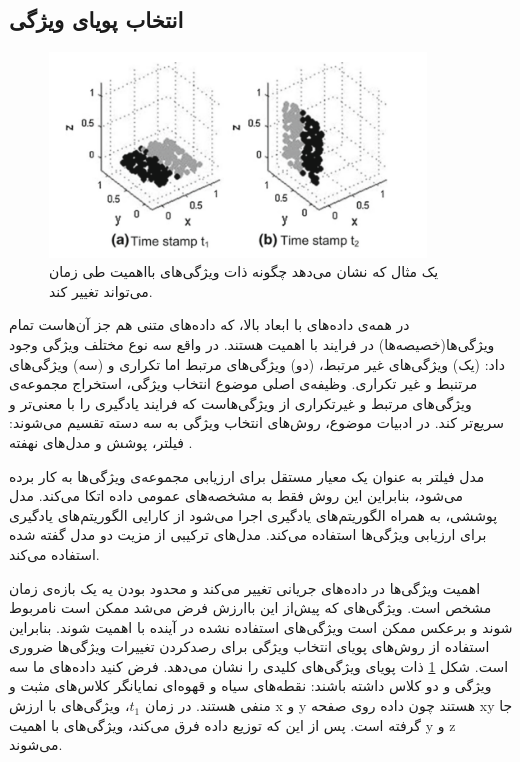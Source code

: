 \subsection{انتخاب پویای ویژگی}

\begin{figure}%
\centerline{\includegraphics[width=10cm]{dynamic_feature}}
\caption{یک مثال که نشان می‌دهد چگونه ذات ویژگی‌های بااهمیت طی زمان می‌تواند تغییر کند.}
\label{fig:dynamic_feature}
\end{figure}

در همه‌ی داده‌های با ابعاد بالا، که داده‌های متنی هم جز آن‌هاست تمام ویژگی‌ها(خصیصه‌ها) در فرایند با اهمیت هستند. در واقع سه نوع مختلف ویژگی وجود داد: (یک) ویژگی‌های غیر مرتبط، (دو) ویژگی‌های مرتبط اما تکراری و (سه) ویژگی‌های مرتنبط و غیر تکراری. وظیفه‌ی اصلی موضوع انتخاب ویژگی، استخراج مجموعه‌ی ویژگی‌های مرتبط و غیرتکراری از ویژگی‌هاست که فرایند یادگیری را با معنی‌تر و سریع‌تر کند. در ادبیات موضوع، روش‌های انتخاب ویژگی به سه دسته تقسیم می‌شوند: فیلتر، پوشش
و مدل‌های نهفته
.

مدل فیلتر به عنوان یک معیار مستقل برای ارزیابی مجموعه‌ی ویژگی‌ها به‌ کار برده می‌شود، بنابراین این روش فقط به مشخصه‌های عمومی داده اتکا می‌کند. مدل پوششی، به همراه الگوریتم‌های یادگیری اجرا می‌شود از کارایی الگوریتم‌های یادگیری برای ارزیابی ویژگی‌ها استفاده می‌کند. مدل‌های ترکیبی از مزیت دو مدل گفته شده استفاده می‌کند.

اهمیت ویژگی‌ها در داده‌های جریانی تغییر می‌کند و محدود بودن یه یک بازه‌ی زمان مشخص است. ویژگی‌های که پیش‌از این باارزش فرض‌ می‌شد ممکن است نامربوط شوند و برعکس ممکن است ویژگی‌های استفاده نشده در آینده با اهمیت شوند. بنابراین استفاده از روش‌های پویای انتخاب ویژگی برای رصدکردن تغییرات ویژگی‌ها ضروری است. شکل
\ref{fig:dynamic_feature}
ذات پویای ویژگی‌های کلیدی را نشان می‌دهد. فرض کنید داده‌های ما سه ویژگی و دو کلاس داشته باشند: نقطه‌های سیاه و قهوه‌ای نمایانگر کلاس‌های مثبت و منفی هستند. در زمان $t_1 $، ویژگی‌های با ارزش x و y هستند چون داده روی صفحه xy جا گرفته است. پس از این که توزیع داده فرق می‌کند، ویژگی‌های با اهمیت y و z می‌شوند.

